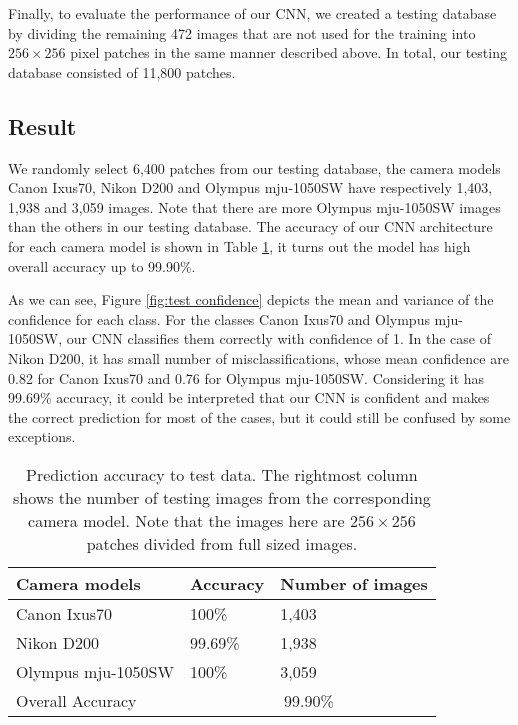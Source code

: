 \documentclass[a4paper, 9pt, twocolumn]{extarticle}
\begin{document}
Finally, to evaluate the performance of our CNN, we created a testing database by dividing the remaining 472 images that are not used for the training into $ 256 \times 256 $ pixel patches in the same manner described above. In total, our testing database consisted of 11,800 patches.

\subsection*{Result}
\label{section:Result}

We randomly select 6,400 patches from our testing database, the camera models Canon Ixus70, Nikon D200 and Olympus mju-1050SW have respectively 1,403, 1,938 and 3,059 images. Note that there are more Olympus mju-1050SW images than the others in our testing database. The accuracy of our CNN architecture for each camera model is shown in Table \ref{tab:train}, it turns out the model has high overall accuracy up to 99.90\%. 

As we can see, Figure \ref{fig:test confidence} depicts the mean and variance of the confidence for each class. For the classes Canon Ixus70 and Olympus mju-1050SW, our CNN classifies them correctly with confidence of 1. In the case of Nikon D200, it has small number of misclassifications, whose mean confidence are 0.82 for Canon Ixus70 and 0.76 for Olympus mju-1050SW. Considering it has 99.69\% accuracy, it could be interpreted that our CNN is confident and makes the correct prediction for most of the cases, but it could still be confused by some exceptions.

\begin{table}
	\center
	\begin{tabular}{ |p{3.2cm}|p{1.4cm}|p{2.6cm}| }
		\hline
		Camera models & Accuracy & Number of images\\
		\hline
		Canon Ixus70 & 100\% & 1,403 \\
		Nikon D200 & 99.69\% & 1,938 \\
		Olympus mju-1050SW & 100\% & 3,059 \\
		\hline
		Overall Accuracy & \multicolumn{2}{c|}{99.90\%} \\
		\hline
	\end{tabular}
	\caption{\label{tab:train} Prediction accuracy to test data. The rightmost column shows the number of testing images from the corresponding camera model. Note that the images here are $ 256 \times 256 $ patches divided from full sized images.}
\end{table}
\end{document}
